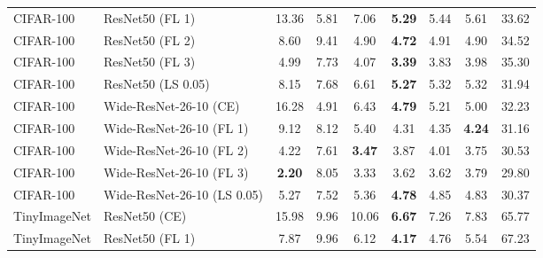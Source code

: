 \begin{table}[h!]
{\begin{tabular}{llccccccc}
   CIFAR-100 &             ResNet50 (FL 1) &                 13.36 &                  5.81 &                  7.06 & \textbf{5.29} &                  5.44 &                  5.61 &                 33.62 \\
   CIFAR-100 &             ResNet50 (FL 2) &                  8.60 &                  9.41 &                  4.90 & \textbf{4.72} &                  4.91 &                  4.90 &                 34.52 \\
   CIFAR-100 &             ResNet50 (FL 3) &                  4.99 &                  7.73 &                  4.07 & \textbf{3.39} &                  3.83 &                  3.98 &                 35.30 \\
   CIFAR-100 &          ResNet50 (LS 0.05) &                  8.15 &                  7.68 &                  6.61 & \textbf{5.27} &                  5.32 &                  5.32 &                 31.94 \\
   CIFAR-100 &      Wide-ResNet-26-10 (CE) &                 16.28 &                  4.91 &                  6.43 & \textbf{4.79} &                  5.21 &                  5.00 &                 32.23 \\
   CIFAR-100 &    Wide-ResNet-26-10 (FL 1) &                  9.12 &                  8.12 &                  5.40 &                  4.31 &                  4.35 & \textbf{4.24} &                 31.16 \\
   CIFAR-100 &    Wide-ResNet-26-10 (FL 2) &                  4.22 &                  7.61 & \textbf{3.47} &                  3.87 &                  4.01 &                  3.75 &                 30.53 \\
   CIFAR-100 &    Wide-ResNet-26-10 (FL 3) & \textbf{2.20} &                  8.05 &                  3.33 &                  3.62 &                  3.62 &                  3.79 &                 29.80 \\
   CIFAR-100 & Wide-ResNet-26-10 (LS 0.05) &                  5.27 &                  7.52 &                  5.36 & \textbf{4.78} &                  4.85 &                  4.83 &                 30.37 \\
TinyImageNet &               ResNet50 (CE) &                 15.98 &                  9.96 &                 10.06 & \textbf{6.67} &                  7.26 &                  7.83 &                 65.77 \\
TinyImageNet &             ResNet50 (FL 1) &                  7.87 &                  9.96 &                  6.12 & \textbf{4.17} &                  4.76 &                  5.54 &                 67.23 \\

\end{tabular}}
\end{table}
